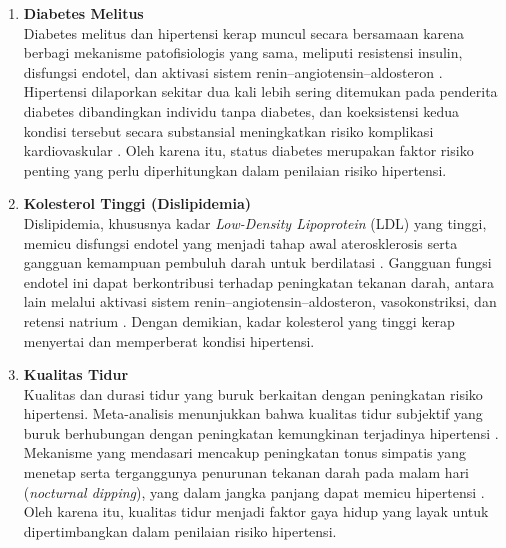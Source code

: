 \begin{enumerate}
    Bukti epidemiologis mengenai hubungan stres dan hipertensi terus berkembang meskipun belum sepenuhnya konsisten. Tinjauan sistematis oleh \textcite{Sparrenberger2009} menyimpulkan bahwa stres akut hanya menimbulkan kenaikan tekanan darah sementara, tetapi sejumlah studi kohort menunjukkan bahwa stres psikososial kronis serta faktor psikososial lain seperti kecemasan berkaitan dengan peningkatan kejadian hipertensi. Temuan tersebut diperkuat oleh meta-analisis \textcite{Gasperin2009} terhadap studi kohort yang menemukan bahwa individu dengan tingkat stres psikologis tinggi memiliki risiko peningkatan tekanan darah yang lebih besar, meskipun besar efeknya tergolong moderat. Dengan demikian, stres dan faktor psikososial merupakan aspek penting yang perlu dipertimbangkan dalam penilaian risiko hipertensi.
    
    \item \textbf{Diabetes Melitus}\\
    Diabetes melitus dan hipertensi kerap muncul secara bersamaan karena berbagi mekanisme patofisiologis yang sama, meliputi resistensi insulin, disfungsi endotel, dan aktivasi sistem renin--angiotensin--aldosteron \autocite{Petrie2018Diabetes}. Hipertensi dilaporkan sekitar dua kali lebih sering ditemukan pada penderita diabetes dibandingkan individu tanpa diabetes, dan koeksistensi kedua kondisi tersebut secara substansial meningkatkan risiko komplikasi kardiovaskular \autocite{Petrie2018Diabetes}. Oleh karena itu, status diabetes merupakan faktor risiko penting yang perlu diperhitungkan dalam penilaian risiko hipertensi.

    \item \textbf{Kolesterol Tinggi (Dislipidemia)}\\
    Dislipidemia, khususnya kadar \emph{Low-Density Lipoprotein} (LDL) yang tinggi, memicu disfungsi endotel yang menjadi tahap awal aterosklerosis serta gangguan kemampuan pembuluh darah untuk berdilatasi \autocite{Higashi2023Dyslipidemia}. Gangguan fungsi endotel ini dapat berkontribusi terhadap peningkatan tekanan darah, antara lain melalui aktivasi sistem renin--angiotensin--aldosteron, vasokonstriksi, dan retensi natrium \autocite{Higashi2023Dyslipidemia}. Dengan demikian, kadar kolesterol yang tinggi kerap menyertai dan memperberat kondisi hipertensi.

    \item \textbf{Kualitas Tidur}\\
    Kualitas dan durasi tidur yang buruk berkaitan dengan peningkatan risiko hipertensi. Meta-analisis menunjukkan bahwa kualitas tidur subjektif yang buruk berhubungan dengan peningkatan kemungkinan terjadinya hipertensi \autocite{Lo2018Sleep}. Mekanisme yang mendasari mencakup peningkatan tonus simpatis yang menetap serta terganggunya penurunan tekanan darah pada malam hari (\emph{nocturnal dipping}), yang dalam jangka panjang dapat memicu hipertensi \autocite{Lo2018Sleep}. Oleh karena itu, kualitas tidur menjadi faktor gaya hidup yang layak untuk dipertimbangkan dalam penilaian risiko hipertensi.
\end{enumerate}

